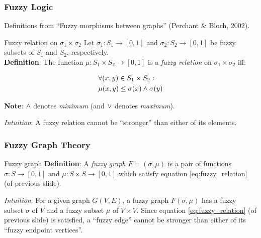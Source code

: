 \begin{frame}
	\frametitle{Fuzzy Logic}

	Definitions from ``Fuzzy morphisms between graphs'' {\footnotesize (Perchant \& Bloch, 2002)}.

	\begin{block}{Fuzzy relation on $\sigma_1 \times \sigma_2$}
		Let $\sigma_1: S_1 \rightarrow [0, 1]$ and $\sigma_2: S_2 \rightarrow [0, 1]$ be fuzzy subsets of $S_1$ and $S_2$, respectively. \\
		\textbf{Definition}: The function $\mu: S_1 \times S_2 \rightarrow [0, 1]$ is a \textit{fuzzy relation} on $\sigma_1 \times \sigma_2$ iff:

		\begin{equation}
			\begin{aligned}
				& \forall (x, y) \in S_1 \times S_2: \\
				& \mu(x, y) \le \sigma(x) \land \sigma(y)
			\end{aligned}
			\label{eq:fuzzy_relation}
		\end{equation}

		{\small \textbf{Note}: $\land$ denotes \textit{minimum} (and $\lor$ denotes \textit{maximum}).}

		\vspace*{2em}

		\textit{Intuition}: A fuzzy relation cannot be ``stronger'' than either of its elements.
	\end{block}
\end{frame}

\begin{frame}
	\frametitle{Fuzzy Graph Theory}

	\begin{block}{Fuzzy graph}
		\textbf{Definition}: A \textit{fuzzy graph} $F = (\sigma, \mu)$ is a pair of functions $\sigma: S \rightarrow [0, 1]$ and $\mu: S \times S \rightarrow [0, 1]$ which satisfy equation \ref{eq:fuzzy_relation} (of previous slide).

		\vspace*{2em}

		\textit{Intuition}: For a given graph $G(V, E)$, a fuzzy graph $F(\sigma, \mu)$ has a fuzzy subset $\sigma$ of $V$ and a fuzzy subset $\mu$ of $V \times V$. Since equation \ref{eq:fuzzy_relation} (of previous slide) is satisfied, a ``fuzzy edge'' cannot be stronger than either of its ``fuzzy endpoint vertices''.
	\end{block}
\end{frame}

